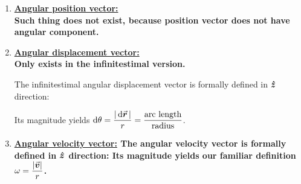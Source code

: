 \documentclass[class=article, crop=false, 12pt]{standalone}
\begin{document}
\begin{enumerate}
    \item \bf{\ul{Angular position vector:}}\\
    Such thing does not exist, 
    because position vector does not have angular component. 
    
    \item \bf{\ul{Angular displacement vector:}}\\
    Only exists in the infinitestimal version.

    The infinitestimal angular displacement vector is formally defined in $\vu*{z}$ direction:
    
    Its magnitude yields $\displaystyle \dd{\theta} = \frac{|\dd{\va*{r}}|}{r} = \frac{\text{arc length}}{\text{radius}}$.
    
    \item \bf{\ul{Angular velocity vector:}}
    The angular velocity vector is formally defined in $\vu*{z}$ direction:
    Its magnitude yields our familiar definition $\displaystyle \omega = \frac{|\va*{v}|}{r}$.
    

\end{enumerate}
\end{document}
